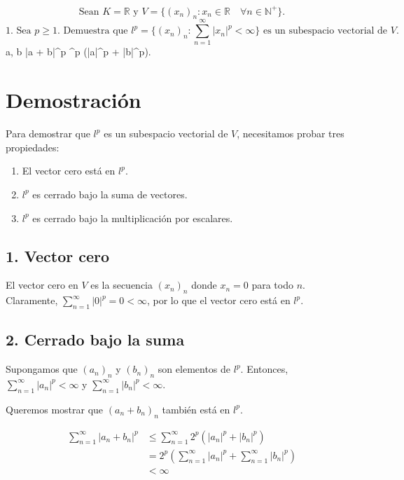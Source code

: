 \documentclass{article}
\begin{document}
\[
\boxed{\text{Sean } K = \mathbb{R} \text{ y } V = \{(x_n)_n : x_n \in \mathbb{R} \quad \forall n \in \mathbb{N}^+\}.}
\]
\[
\boxed{\text{1. Sea } p \geq 1. \text{ Demuestra que } l^p = \{(x_n)_n : \sum_{n=1}^\infty |x_n|^p < \infty\} \text{ es un subespacio vectorial de } V.}
\]
 a, b \in {}  |a + b|^p ^p (|a|^p + |b|^p).

\section*{Demostración}

Para demostrar que \( l^p \) es un subespacio vectorial de \( V \), necesitamos probar tres propiedades:

\begin{enumerate}
    \item El vector cero está en \( l^p \).
    \item \( l^p \) es cerrado bajo la suma de vectores.
    \item \( l^p \) es cerrado bajo la multiplicación por escalares.
\end{enumerate}

\subsection*{1. Vector cero}

El vector cero en \( V \) es la secuencia \( (x_n)_n \) donde \( x_n = 0 \) para todo \( n \). Claramente, \( \sum_{n=1}^\infty |0|^p = 0 < \infty \), por lo que el vector cero está en \( l^p \).

\subsection*{2. Cerrado bajo la suma}

Supongamos que \( (a_n)_n \) y \( (b_n)_n \) son elementos de \( l^p \). Entonces, \( \sum_{n=1}^\infty |a_n|^p < \infty \) y \( \sum_{n=1}^\infty |b_n|^p < \infty \).

Queremos mostrar que \( (a_n + b_n)_n \) también está en \( l^p \).

\[
\begin{aligned}
\sum_{n=1}^\infty |a_n + b_n|^p &\leq \sum_{n=1}^\infty 2^p(|a_n|^p + |b_n|^p) \\
&= 2^p \left( \sum_{n=1}^\infty |a_n|^p + \sum_{n=1}^\infty |b_n|^p \right) \\
&< \infty
\end{aligned}
\]
\end{document}
